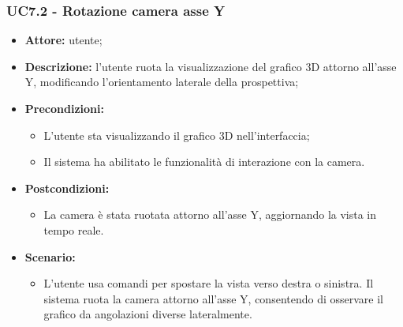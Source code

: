 \subsubsection{UC7.2 - Rotazione camera asse Y}
\begin{itemize}
    \item \textbf{Attore:} utente;
    \item \textbf{Descrizione:} l'utente ruota la visualizzazione del grafico 3D attorno all'asse Y, modificando l'orientamento laterale della prospettiva;
    \item \textbf{Precondizioni:} 
    \begin{itemize}
        \item L'utente sta visualizzando il grafico 3D nell'interfaccia;
        \item Il sistema ha abilitato le funzionalità di interazione con la camera.
    \end{itemize}
    \item \textbf{Postcondizioni:} 
    \begin{itemize}
        \item La camera è stata ruotata attorno all'asse Y, aggiornando la vista in tempo reale.
    \end{itemize}
    \item \textbf{Scenario:} 
    \begin{itemize}
        \item L'utente usa comandi per spostare la vista verso destra o sinistra. Il sistema ruota la camera attorno all'asse Y, consentendo di osservare il grafico da angolazioni diverse lateralmente.
    \end{itemize}
\end{itemize}


